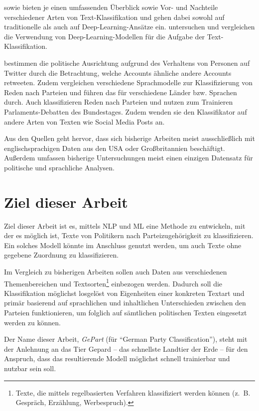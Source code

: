 \textcite{li_survey_2021} sowie \textcite{kowsari_text_2019} bieten je einen umfassenden Überblick sowie Vor- und Nachteile verschiedener Arten von Text-Klassifikation und gehen dabei sowohl auf traditionelle als auch auf Deep-Learning-Ansätze ein.
\textcite{minaee_deep_2022} untersuchen und vergleichen die Verwendung von Deep-Learning-Modellen für die Aufgabe der Text-Klassifikation.

\textcite{wong_quantifying_2016} bestimmen die politische Ausrichtung aufgrund des Verhaltens von Personen auf Twitter durch die Betrachtung, welche Accounts ähnliche andere Accounts retweeten.
Zudem vergleichen \textcite{doan_using_2022} verschiedene Sprachmodelle zur Klassifizierung von Reden nach Parteien und führen das für verschiedene Länder bzw. Sprachen durch.
Auch \textcite{biessmann_predicting_2016} klassifizieren Reden nach Parteien und nutzen zum Trainieren Parlaments-Debatten des Bundestages. Zudem wenden sie den Klassifikator auf andere Arten von Texten wie Social Media Posts an.

Aus den Quellen geht hervor, dass sich bisherige Arbeiten meist ausschließlich mit englischsprachigen Daten aus den USA oder Großbritannien beschäftigt. Außerdem umfassen bisherige Untersuchungen meist einen einzigen Datensatz für politische und sprachliche Analysen.

\section{Ziel dieser Arbeit} \label{sec:thesisGoal}

Ziel dieser Arbeit ist es, mittels \ac{NLP} und \ac{ML} eine Methode zu entwickeln, mit der es möglich ist, Texte von Politikern nach Parteizugehörigkeit zu klassifizieren. Ein solches Modell könnte im Anschluss genutzt werden, um auch Texte ohne gegebene Zuordnung zu klassifizieren.

Im Vergleich zu bisherigen Arbeiten sollen auch Daten aus verschiedenen Themenbereichen und Textsorten\footnote{Texte, die mittels regelbasierten Verfahren klassifiziert werden können (z. B. Gespräch, Erzählung, Werbespruch).} einbezogen werden. Dadurch soll die Klassifikation möglichst losgelöst von Eigenheiten einer konkreten Textart und primär basierend auf sprachlichen und inhaltlichen Unterschieden zwischen den Parteien funktionieren, um folglich auf sämtlichen politischen Texten eingesetzt werden zu können.

Der Name dieser Arbeit, \textit{GePart} (für \enquote{German Party Classification}), steht mit der Anlehnung an das Tier Gepard -- das schnellste Landtier der Erde -- für den Anspruch, dass das resultierende Modell möglichst schnell trainierbar und nutzbar sein soll.

